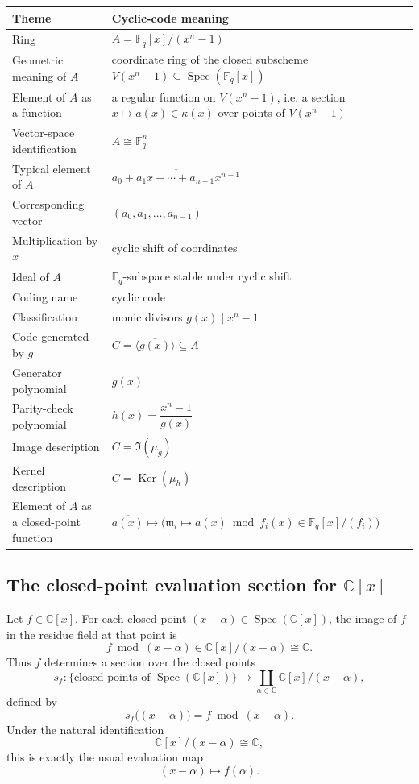 \documentclass[11pt]{article}
\theoremstyle{definition}
\newcommand{\C}{\mathbb{C}}
\newcommand{\F}{\mathbb{F}}
\newcommand{\Spec}{\operatorname{Spec}}
\newcommand{\Ker}{\operatorname{Ker}}
\newcommand{\kk}[1]{\kappa\!\left(#1\right)}
\newcommand{\ideal}[1]{\langle #1\rangle}
\newcommand{\ol}[1]{\overline{#1}}
\begin{document}
\begin{longtable}{@{}p{}p{}@{}}
	\toprule
	\textbf{Theme} & \textbf{Cyclic-code meaning} \\ \midrule
	Ring & \(A=\F_q[x]/(x^n-1)\) \\
	Geometric meaning of \(A\) & coordinate ring of the closed subscheme \(V(x^n-1)\subseteq \Spec(\F_q[x])\) \\
	Element of \(A\) as a function & a regular function on \(V(x^n-1)\), i.e. a section \(x\mapsto a(x)\in \kk{x}\) over points of \(V(x^n-1)\) \\
	Vector-space identification & \(A\cong \F_q^n\) \\
	Typical element of \(A\) & \(\ol{a_0+a_1x+\cdots+a_{n-1}x^{n-1}}\) \\
	Corresponding vector & \((a_0,a_1,\dots,a_{n-1})\) \\
	Multiplication by \(x\) & cyclic shift of coordinates \\
	Ideal of \(A\) & \(\F_q\)-subspace stable under cyclic shift \\
	Coding name & cyclic code \\
	Classification & monic divisors \(g(x)\mid x^n-1\) \\
	Code generated by \(g\) & \(C=\ideal{\ol{g(x)}}\subseteq A\) \\
	Generator polynomial & \(g(x)\) \\
	Parity-check polynomial & \(h(x)=\dfrac{x^n-1}{g(x)}\) \\
	Image description & \(C=\Im(\mu_g)\) \\
	Kernel description & \(C=\Ker(\mu_h)\) \\
	Element of \(A\) as a closed-point function & 
	\(\ol{a(x)}\mapsto \bigl(\mathfrak m_i\mapsto a(x)\bmod f_i(x)\in \F_q[x]/(f_i)\bigr)\) \\
	\bottomrule
\end{longtable}

\newpage
\subsection{The closed-point evaluation section for \texorpdfstring{$\C[x]$}{C[x]}}

Let \(f\in \C[x]\). For each closed point \((x-\alpha)\in \Spec(\C[x])\), the image of \(f\) in the residue field at that point is
\[
f \bmod (x-\alpha)\in \C[x]/(x-\alpha)\cong \C.
\]
Thus \(f\) determines a section over the closed points
\[
s_f:\{\text{closed points of }\Spec(\C[x])\}\longrightarrow
\coprod_{\alpha\in\C}\C[x]/(x-\alpha),
\]
defined by
\[
s_f\bigl((x-\alpha)\bigr)=f \bmod (x-\alpha).
\]
Under the natural identification
\[
\C[x]/(x-\alpha)\cong \C,
\]
this is exactly the usual evaluation map
\[
(x-\alpha)\longmapsto f(\alpha).
\]
\end{document}
